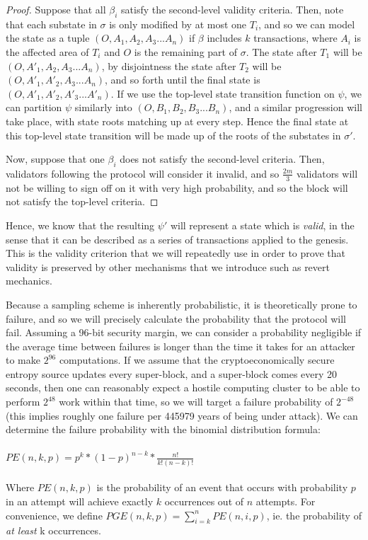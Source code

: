 \documentclass[11pt,a4paper]{report}
\theoremstyle{plain}
\theoremstyle{definition}
\theoremstyle{remark}
\begin{document}
\begin{proof}
Suppose that all $\beta_i$ satisfy the second-level validity criteria. Then, note that each substate in $\sigma$ is only modified by at most one $T_i$, and so we can model the state as a tuple $(O, A_1, A_2, A_3 ... A_n)$ if $\beta$ includes $k$ transactions, where $A_i$ is the affected area of $T_i$ and $O$ is the remaining part of $\sigma$. The state after $T_1$ will be $(O, A'_1, A_2, A_3 ... A_n)$, by disjointness the state after $T_2$ will be $(O, A'_1, A'_2, A_3 ... A_n)$, and so forth until the final state is $(O, A'_1, A'_2, A'_3 ... A'_n)$. If we use the top-level state transition function on $\psi$, we can partition $\psi$ similarly into $(O, B_1, B_2, B_3 ... B_n)$, and a similar progression will take place, with state roots matching up at every step. Hence the final state at this top-level state transition will be made up of the roots of the substates in $\sigma'$.

Now, suppose that one $\beta_i$ does not satisfy the second-level criteria. Then, validators following the protocol will consider it invalid, and so $\frac{2m}{3}$ validators will not be willing to sign off on it with very high probability, and so the block will not satisfy the top-level criteria.
\end{proof}

Hence, we know that the resulting $\psi'$ will represent a state which is \emph{valid}, in the sense that it can be described as a series of transactions applied to the genesis. This is the validity criterion that we will repeatedly use in order to prove that validity is preserved by other mechanisms that we introduce such as revert mechanics.

Because a sampling scheme is inherently probabilistic, it is theoretically prone to failure, and so we will precisely calculate the probability that the protocol will fail. Assuming a 96-bit security margin, we can consider a probability negligible if the average time between failures is longer than the time it takes for an attacker to make $2^{96}$ computations. If we assume that the cryptoeconomically secure entropy source updates every super-block, and a super-block comes every 20 seconds, then one can reasonably expect a hostile computing cluster to be able to perform $2^{48}$ work within that time, so we will target a failure probability of $2^{-48}$ (this implies roughly one failure per 445979 years of being under attack). We can determine the failure probability with the binomial distribution formula:
\\
\\
$PE(n, k, p) = p^k * (1-p)^{n-k} * \frac{n!}{k!(n-k)!}$
\\
\\
Where $PE(n, k, p)$ is the probability of an event that occurs with probability $p$ in an attempt will achieve exactly $k$ occurrences out of $n$ attempts. For convenience, we define $PGE(n, k, p) = \sum_{i=k}^n PE(n, i, p)$, ie. the probability of \emph{at least} k occurrences.
\end{document}
